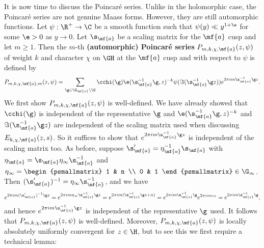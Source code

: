     It is now time to discuss the Poincar\'e series. Unlike in the holomorphic case, the Poincar\'e series are not genuine Maass forms. However, they are still automorphic functions. Let $\psi:\R^{+} \to \C$ be a smooth function such that $\psi(y) \ll y^{1+\e}$ for some $\e > 0$ as $y \to 0$. Let $\s_{\mf{a}}$ be a scaling matrix for the $\mf{a}$ cusp and let $m \ge 1$. Then the $m$-th \textbf{(automorphic) Poincar\'e series} $P_{m,k,\chi,\mf{a}}(z,\psi)$ of weight $k$ and character $\chi$ on $\GH$ at the $\mf{a}$ cusp and with respect to $\psi$ is defined by
    \[
      P_{m,k,\chi,\mf{a},m}(z,\psi) = \sum_{\g \in \G_{\mf{a}}\backslash\G}\cchi(\g)\e(\s_{\mf{a}}^{-1}\g,z)^{-k}\psi(\Im(\s_{\mf{a}}^{-1}\g z))e^{2\pi im\s_{\mf{a}}^{-1}\g z}.
    \]
    We first show $P_{m,k,\chi,\mf{a}}(z,\psi)$ is well-defined. We have already showed that $\cchi(\g)$ is independent of the representative $\g$ and $\e(\s_{\mf{a}}^{-1}\g,z)^{-k}$ and $\Im(\s_{\mf{a}}^{-1}\g z)$ are independent of the scaling matrix used when discussing $E_{k,\chi,\mf{a}}(z,s)$. So it suffices to show that $e^{2\pi im\s_{\mf{a}}^{-1}\g z}$ is independent of the scaling matrix too. As before, suppose $\s_{\mf{a}}' = \eta_{\mf{a}}^{-1}\s_{\mf{a}}$ with $\eta_{\mf{a}} = \s_{\mf{a}}\eta_{\infty}\s_{\mf{a}}^{-1}$ and $\eta_{\infty} = \begin{psmallmatrix} 1 & n \\ 0 & 1 \end{psmallmatrix} \in \G_{\infty}$. Then $(\s_{\mf{a}}')^{-1} = \eta_{\infty}\s_{\mf{a}}^{-1}$, and we have
    \[
      e^{2\pi im(\s_{\mf{a}}')^{-1}\g z} = e^{2\pi im\eta_{\infty}\s_{\mf{a}}^{-1}\g z} = e^{2\pi im(\s_{\mf{a}}^{-1}\g z+n)} = e^{2\pi im\s_{\mf{a}}^{-1}\g}e^{2\pi imnz} = e^{2\pi im\s_{\mf{a}}^{-1}\g},
    \]
    and hence $e^{2\pi im\s_{\mf{a}}^{-1}\g z}$ is independent of the representative $\g$ used. It follows that $P_{m,k,\chi,\mf{a}}(z,\psi)$ is well-defined. Moreover, $P_{m,k,\chi,\mf{a}}(z,\psi)$ is locally absolutely uniformly convergent for $z \in \H$, but to see this we first require a technical lemma:


